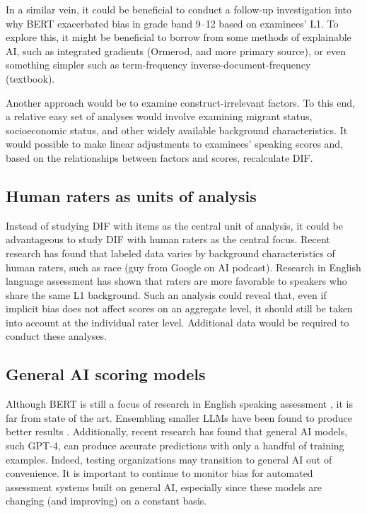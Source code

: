 \documentclass [PhD] {uclathes}
\begin{document}
In a similar vein, it could be beneficial to conduct a follow-up investigation into why BERT exacerbated bias in grade band 9–12 based on examinees’ L1. To explore this, it might be beneficial to borrow from some methods of explainable AI, such as integrated gradients (Ormerod, and more primary source), or even something simpler such as term-frequency inverse-document-frequency (textbook).

Another approach would be to examine construct-irrelevant factors. To this end, a relative easy set of analyses would involve examining migrant status, socioeconomic status, and other widely available background characteristics. It would possible to make linear adjustments to examinees’ speaking scores and, based on the relationships between factors and scores, recalculate DIF. 

\subsection{Human raters as units of analysis}

Instead of studying DIF with items as the central unit of analysis, it could be advantageous to study DIF with human raters as the central focus. Recent research has found that labeled data varies by background characteristics of human raters, such as race (guy from Google on AI podcast). Research in English language assessment has shown that raters are more favorable to speakers who share the same L1 background. Such an analysis could reveal that, even if implicit bias does not affect scores on an aggregate level, it should still be taken into account at the individual rater level. Additional data would be required to conduct these analyses. 

\subsection{General AI scoring models}

Although BERT is still a focus of research in English speaking assessment \citep[e.g.][]{wang2021automated}, it is far from state of the art. Ensembling smaller LLMs have been found to produce better results \citep{ormerod2021automated}. Additionally, recent research has found that general AI models, such GPT-4, can produce accurate predictions with only a handful of training examples. Indeed, testing organizations may transition to general AI out of convenience. It is important to continue to monitor bias for automated assessment systems built on general AI, especially since these models are changing (and improving) on a constant basis.  
\end{document}
